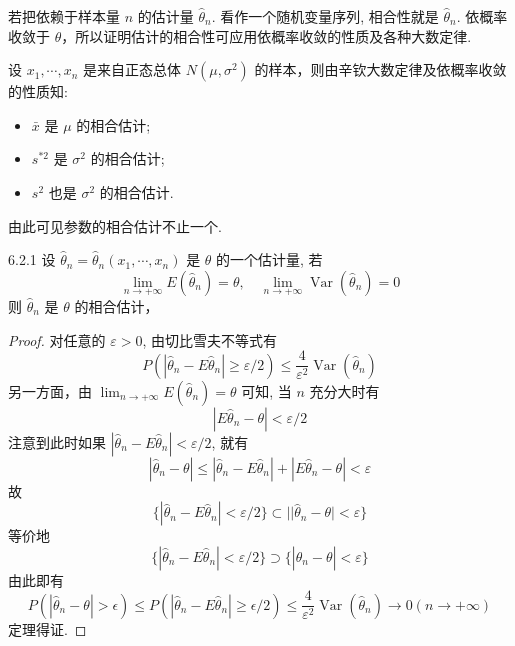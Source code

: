若把依赖于样本量 $n$ 的估计量 $\hat{\theta}_n$. 看作一个随机变量序列, 相合性就是 $\hat{\theta}_n$. 依概率收敛于 $\theta$，所以证明估计的相合性可应用依概率收敛的性质及各种大数定律.

\begin{example}\label{exam:6.2.1}
设 $x_1,\cdots,x_n$ 是来自正态总体 $N(\mu,\sigma^2)$ 的样本，则由辛钦大数定律及依概率收敛的性质知:
\begin{itemize}
\item $\bar x$ 是 $\mu$ 的相合估计;
\item $s^{*2}$ 是 $\sigma^2$ 的相合估计;
\item $s^2$ 也是 $\sigma^2$ 的相合估计.
\end{itemize}
由此可见参数的相合估计不止一个.
\end{example}

\begin{theorem}{}{6.2.1}
设 $\hat{\theta}_n=\hat{\theta}_n(x_1,\cdots,x_n)$ 是 $\theta$ 的一个估计量, 若
\begin{equation}\label{eq:6.2.2}
\lim _{n \rightarrow+\infty} E(\hat{\theta}_{n})=\theta, \quad \lim _{n \rightarrow+\infty} \operatorname{Var}(\hat{\theta}_{n})=0
\end{equation}
则 $\hat{\theta}_n$ 是 $\theta$ 的相合估计，
\end{theorem}\begin{proof}
对任意的 $\varepsilon>0$, 由切比雪夫不等式有
\[P(|\hat{\theta}_{n}-E \hat{\theta}_{n}| \geqslant \varepsilon / 2) \leqslant \frac{4}{\varepsilon^{2}} \operatorname{Var}(\hat{\theta}_{n})\]
另一方面，由 $\lim _{n \rightarrow+\infty} E(\hat{\theta}_{n})=\theta$ 可知, 当 $n$ 充分大时有
\[|E \hat{\theta}_{n}-\theta|<\varepsilon / 2\]
注意到此时如果 $|\hat{\theta}_n-E\hat{\theta}_n|<\varepsilon/2$, 就有
\[|\hat{\theta}_{n}-\theta| \leqslant|\hat{\theta}_{n}-E \hat{\theta}_{n}|+|E \hat{\theta}_{n}-\theta|<\varepsilon\]
故
\[\{|\hat{\theta}_{n}-E \hat{\theta}_{n}|<\varepsilon / 2\} \subset| | \hat{\theta}_{n}-\theta |<\varepsilon \}\]
等价地
\[\{ | \hat{\theta}_{n}-E \hat{\theta}_{n}|< \varepsilon/ 2 \} \supset\{|\hat{\theta}_{n}-\theta|<\varepsilon \}\]
由此即有
\[P(|\hat{\theta}_{n}-\theta|>\epsilon) \leqslant P(|\hat{\theta}_{n}-E \hat{\theta}_{n}| \geqslant \epsilon / 2) \leqslant \frac{4}{\varepsilon^{2}} \operatorname{Var}(\hat{\theta}_{n}) \rightarrow 0(n \rightarrow+\infty)\]
定理得证.
\end{proof}

